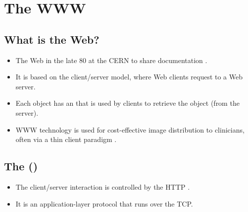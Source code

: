\chapter{The \gls{WWW}}

\section{What is the Web?}
\begin{itemize}
\item The Web  in the late 80 at the
  \gls{CERN} to share documentation \cite{wikipedia_WWW}.
\item It is based on the client/server model, where Web clients request
   to a Web server.
\item Each object has an  that
  is used by clients to retrieve the object (from the server).
\item WWW technology is used for cost-effective image distribution to
  clinicians, often via a thin client paradigm
  \cite{bushberg2011essential}.
\end{itemize}

\section{The  ()}
\begin{itemize}
\item The client/server interaction is controlled by the \gls{HTTP} \cite{wikipedia_HTTP}.
\item It is an application-layer protocol that runs over the \gls{TCP}.
\end{itemize}

